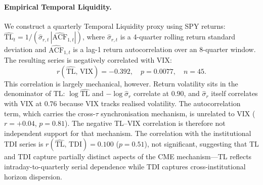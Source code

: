 \documentclass[preprint,12pt,authoryear]{elsarticle}
\begin{document}
\paragraph{Empirical Temporal Liquidity.}
We construct a quarterly Temporal Liquidity proxy using SPY returns:
$\widehat{\mathrm{TL}}_t = 1/(\hat{\sigma}_{r,t}\,|\widehat{\mathrm{ACF}}_{1,t}|)$,
where $\hat{\sigma}_{r,t}$ is a 4-quarter rolling return standard deviation
and $\widehat{\mathrm{ACF}}_{1,t}$ is a lag-1 return autocorrelation over
an 8-quarter window.
The resulting series is negatively correlated with VIX:
\[
  r(\widehat{\mathrm{TL}},\,\mathrm{VIX}) = -0.392,
  \quad p = 0.0077, \quad n = 45.
\]
This correlation is largely mechanical, however.
Return volatility sits in the denominator of TL: $\log\widehat{\mathrm{TL}}$ and
$-\log\hat{\sigma}_r$ correlate at $0.90$, and $\hat{\sigma}_r$ itself
correlates with VIX at $0.76$ because VIX tracks realised volatility.
The autocorrelation term, which carries the cross-$\tau$ synchronisation
mechanism, is unrelated to VIX ($r = +0.04$, $p = 0.81$).
The negative TL--VIX correlation is therefore not independent support for that
mechanism.
The correlation with the institutional TDI series is
$r(\widehat{\mathrm{TL}},\,\mathrm{TDI}) = 0.100$ ($p = 0.51$), not
significant, suggesting that TL and TDI capture partially distinct aspects
of the CME mechanism---TL reflects intraday-to-quarterly serial dependence
while TDI captures cross-institutional horizon dispersion.
\end{document}
